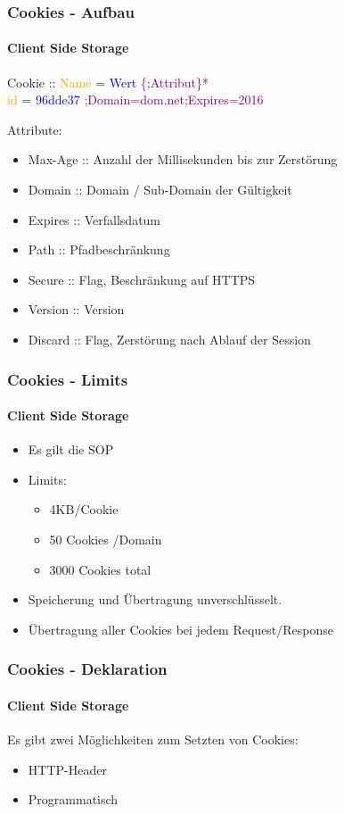 \begin{frame}
\frametitle{Cookies - Aufbau}
\framesubtitle{Client Side Storage}
	\begin{center}
		{\Large
		Cookie :: \textcolor{orange}{Name} = \textcolor{blue}{Wert} \textcolor{purple}{\{;Attribut\}*} \\
		\vspace{5 mm}
		\textcolor{orange}{id} = \textcolor{blue}{96dde37} \textcolor{purple}{;Domain=dom.net;Expires=2016}
		}
	\end{center}
	Attribute:
	\begin{itemize}
		\item <1> Max-Age :: Anzahl der Millisekunden bis zur Zerstörung
		\item <1> Domain ::  Domain / Sub-Domain der Gültigkeit
		\item <1> Expires ::  Verfallsdatum
		\item <1> Path :: Pfadbeschränkung
		\item <1> Secure ::  Flag, Beschränkung auf HTTPS
		\item <1> Version :: Version
		\item <1> Discard ::  Flag, Zerstörung nach Ablauf der Session
	\end{itemize}
\end{frame}

\begin{frame}
\frametitle{Cookies - Limits}
\framesubtitle{Client Side Storage}
	\begin{itemize}
		\item Es gilt die SOP
		\item Limits:
		\begin{itemize}
			\item 4KB/Cookie
			\item 50 Cookies /Domain
			\item 3000 Cookies total
		\end{itemize} 
		\item Speicherung und Übertragung unverschlüsselt.
		\item Übertragung aller Cookies bei jedem Request/Response
	\end{itemize}
\end{frame}

\begin{frame}
\frametitle{Cookies - Deklaration}
\framesubtitle{Client Side Storage}

	Es gibt zwei Möglichkeiten zum Setzten von Cookies:
	\begin{itemize}
		\item HTTP-Header
		\item Programmatisch
	\end{itemize}
\end{frame}

